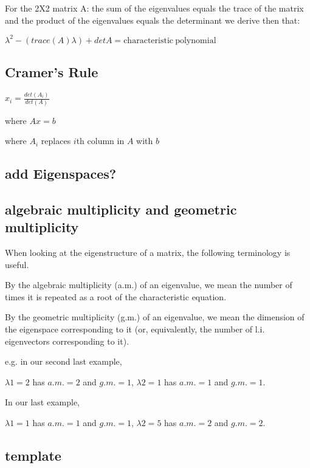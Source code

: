 \documentclass{extarticle}
\begin{document}
\begin{multicols}{4}
For the 2X2 matrix A: the sum of the eigenvalues equals the trace of the matrix and the product of the eigenvalues equals the determinant we derive then that:

$\lambda^2-\left(trace\left(A\right)\lambda\right)+detA=\mathrm{characteristic\ polynomial}$






\subsection{Cramer’s Rule}


$x_i=\frac{det(A_i)}{det (A)}$ 

where $Ax=b$

where $A_i$ replaces $i$th column in $A$ with $b$


\begin{tcolorbox}[enhanced jigsaw,sharp corners,coltext=black,colback=Red!25!white,boxrule=0pt,breakable,size=minimal]
\subsection{add Eigenspaces?}
\end{tcolorbox}


\begin{tcolorbox}[enhanced jigsaw,sharp corners,coltext=black,colback=Red!25!white,boxrule=0pt,breakable,size=minimal]
\subsection{algebraic multiplicity and geometric multiplicity}

When looking at the eigenstructure of a matrix, the following terminology is useful.

By the algebraic multiplicity (a.m.) of an eigenvalue, we mean the number of times it is repeated as a root of the characteristic equation.

By the geometric multiplicity (g.m.) of an eigenvalue, we mean the dimension of the eigenspace corresponding to it (or, equivalently, the number of l.i. eigenvectors corresponding to it).

e.g. in our second last example,

$\lambda1 = 2$ has $a.m.=2$ and $g.m.=1$, $\lambda2 = 1$ has $a.m.=1$ and $g.m.=1$.

In our last example,

$\lambda1 = 1$ has $a.m.=1$ and $g.m.=1$, $\lambda2 = 5$ has $a.m.=2$ and $g.m.=2$.
\end{tcolorbox}




\begin{tcolorbox}[enhanced jigsaw,sharp corners,coltext=black,colback=BurntOrange!25!white,boxrule=0pt,breakable,size=minimal]
\subsection{template}

\end{tcolorbox}





\end{multicols}
\end{document}
